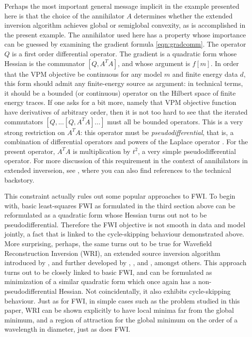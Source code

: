 Perhaps the most important general message implicit in the example
presented here is that the choice of the annihilator $A$ determines
whether the extended inversion algorithm achieves global or semiglobal
convexity, as is accomplished in the present example. The annihilator
used here has a property whose importance can be guessed by
examining the gradient formula \ref{eqn:gradcomm}. The operator $Q$ is
a first order differential operator. The gradient is a quadratic form
whose Hessian is the communator $[Q,A^TA]$, and whose argument is
$f[m]$. In order that the VPM objective be continuous for any model
$m$ and finite energy data $d$, this form should admit any
finite-energy source as argument: in technical terms, it should be a
bounded (or continuous) operator on the Hilbert space of finite energy
traces. If one asks for a bit more, namely that VPM objective function
have derivatives of arbitrary order, then it is not too hard to see
that the iterated commutators $[Q,...[Q,A^TA]...]$ must all be bounded
operators. This is a very strong restriction on $A^TA$: this operator
must be {\em pseudodifferential}, that is, a combination of
differential operators and powers of the Laplace operator
\cite[]{Tay:81}. For the present operator, $A^TA$ is
multiplication by $t^2$, a very simple pseudodifferential
operator. For more discussion of this requirement in the context of
annihilators in extended inverseion, see \cite{geoprosp:2008}, where
you can also find references to the technical backstory.

This constraint actually rules out some popular approaches to FWI. To
begin with, basic least-squares FWI as formulated in the third section
above can be reformulated as a quadratic form whose Hessian turns out
not to be pseudodifferential. Therefore the FWI objective is not
smooth in data and model jointly, a fact that is linked to the
cycle-skipping behaviour demonstrated above. More surprising, perhaps,
the same turns out to be true for Wavefield Reconstruction Inversion (WRI),
an extended source inversion algorithm introduced by
\cite{LeeuwenHerrmannWRI:13}, and further developed by
\cite{LeeuwenHerrmann:16}, \cite{WangYingst:SEG16}, and
\cite{Aghamiry:19}, amongst others. This approach turns out to be closely
linked to basic FWI, and can be formulated as minimization of a similar quadratic form
which once again has a non-pseudodifferential Hessian. Not
coincidentally, it also exhibits cycle-skipping behaviour. Just as for
FWI, in simple cases such as the problem studied in this paper, WRI
can be shown explicitly to have local minima far from the global
minimum, and a region of attraction for the global minimum on the
order of a wavelength in diameter, just as does FWI.

